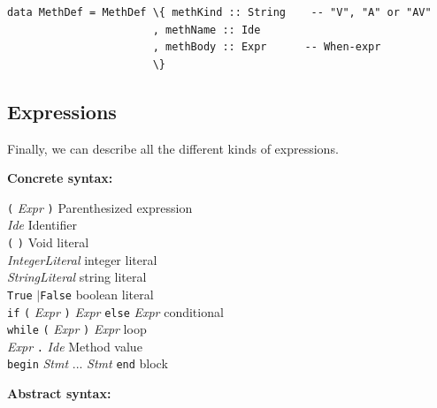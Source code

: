 \documentclass[11pt]{article}
\newcommand{\hm}{\hspace*{1em}}
\newcommand{\nterm}[1]{\emph{#1}}
\newcommand{\term}[1]{\texttt{#1}}
\newcommand{\many}[2]{#1 #2 ... #2 #1}
\newcommand{\alt}{{$\mid$}}
\newcommand{\gram}[2]{    \hm\makebox[10em][l]{\it #1}\makebox[1.5em][l]{::=}    #2}
\newcommand{\grammore}[1]{\hm\makebox[10em][l]{      }\makebox[1.5em][l]{}       #1}
\begin{document}
\begin{Verbatim}[frame=single, commandchars=\\\{\}]
data MethDef = MethDef \{ methKind :: String    -- "V", "A" or "AV"
                       , methName :: Ide
                       , methBody :: Expr      -- When-expr
                       \}
\end{Verbatim}


\subsection{Expressions}

\label{sec_syntax_expr}

Finally, we can describe all the different kinds of expressions.

{\bf Concrete syntax:}

\gram{Expr}{\term{(} \nterm{Expr} \term{)}}                                               \hfill Parenthesized expression \\
\grammore{\nterm{Ide}}                                                                    \hfill Identifier \\
\grammore{\term{(} \term{)}}                                                              \hfill Void literal \\
\grammore{\nterm{IntegerLiteral}}                                                         \hfill integer literal \\
\grammore{\nterm{StringLiteral}}                                                          \hfill string literal \\
\grammore{\term{True} \alt \hm \term{False}}                                              \hfill boolean literal \\
\grammore{\term{if} \term{(} \nterm{Expr} \term{)} \nterm{Expr} \term{else} \nterm{Expr}} \hfill conditional  \\
\grammore{\term{while} \term{(} \nterm{Expr} \term{)} \nterm{Expr}}                       \hfill loop  \\
\grammore{\nterm{Expr} \term{.} \nterm{Ide}}                                              \hfill Method value \\
\grammore{\term{begin} \many{\nterm{Stmt}}{\hm} \term{end}}                               \hfill block

{\bf Abstract syntax:}
\end{document}
